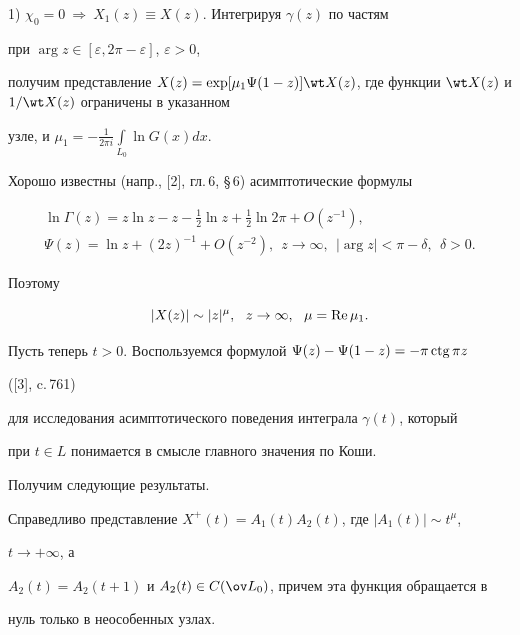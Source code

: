 


1) $\chi_0=0\ \Rightarrow\ X_1(z)\equiv X(z)$. Интегрируя $\gamma(z)$ по частям 


при $\arg z\in[\varepsilon,2\pi-\varepsilon]$, $\varepsilon>0$, 


получим представление $X(z)=\exp[\mu_1\Psi(1-z)]\wt X(z)$, где функции $\wt 


X(z)$ и $1/\wt X(z)$ ограничены в указанном 


узле, и $\mu_1=-\frac{1}{2\pi i}\int\limits_{L_0}\ln G(x)dx$. 


 


Хорошо известны (напр., [2], гл.\,6, \S\,6) асимптотические формулы 


\begin{gather} 


\ln\Gamma(z)=z\ln z-z-\frac{1}{2}\ln z+\frac{1}{2}\ln2\pi+O(z^{-1}),\\ 


\Psi(z)=\ln z+(2z)^{-1}+O(z^{-2}),\ \ z\to\infty, 


\ \ |\arg z|<\pi-\delta,\ \ \delta>0. 


\end{gather} 


Поэтому 


\begin{equation} 


|X(z)|\sim|z|^\mu,\ \ z\to\infty,\ \ \mu=\re\mu_1. 


\end{equation} 


 


Пусть теперь $t>0$. Воспользуемся формулой $\Psi(z)-\Psi(1-z)=-\pi\operatorname{ctg}\pi z$ 


([3], c.\,761) 


для исследования асимптотического поведения интеграла $\gamma(t)$, который 


при $t\in L$ понимается в смысле главного значения по Коши. 


Получим следующие результаты. 


 


 


\begin{lem} 


Справедливо представление $X^+(t)=A_1(t)A_2(t)$, где $|A_1(t)|\sim t^\mu$, 


$t\to+\infty$, а 


$A_2(t)=A_2(t+1)$ и $A_2(t)\in C(\ov L_0)$, причем эта функция обращается в 


нуль только в неособенных узлах. 


\end{lem} 


